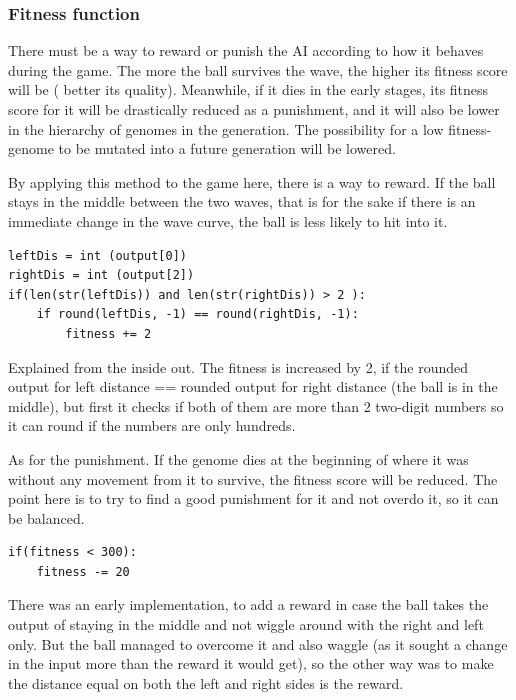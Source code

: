 \subsubsection{Fitness function}
There must be a way to reward or punish the AI according to how it behaves during the game. The more the ball survives the wave, the higher its fitness score will be ( better its quality). Meanwhile, if it dies in the early stages, its fitness score for it will be drastically reduced as a punishment, and it will also be lower in the hierarchy of genomes in the generation. The possibility for a low fitness-genome to be mutated into a future generation will be lowered.

By applying this method to the game here, there is a way to reward. If the ball stays in the middle between the two waves, that is for the sake if there is an immediate change in the wave curve, the ball is less likely to hit into it.

\begin{listing}[H]
\begin{verbatim}
leftDis = int (output[0])
rightDis = int (output[2])
if(len(str(leftDis)) and len(str(rightDis)) > 2 ):
	if round(leftDis, -1) == round(rightDis, -1):
		fitness += 2
\end{verbatim}
\end{listing}

Explained from the inside out. The fitness is increased by 2, if the rounded output for left distance == rounded output for right distance (the ball is in the middle), but first it checks if both of them are more than 2 two-digit numbers so it can round if the numbers are only hundreds.

As for the punishment. If the genome dies at the beginning of where it was without any movement from it to survive, the fitness score will be reduced. The point here is to try to find a good punishment for it and not overdo it, so it can be balanced.

\begin{listing}[H]
	\begin{verbatim}
if(fitness < 300):
	fitness -= 20
	\end{verbatim}
\end{listing}

There was an early implementation, to add a reward in case the ball takes the output of staying in the middle and not wiggle around with the right and left only. But the ball managed to overcome it and also waggle (as it sought a change in the input more than the reward it would get), so the other way was to make the distance equal on both the left and right sides is the reward.

